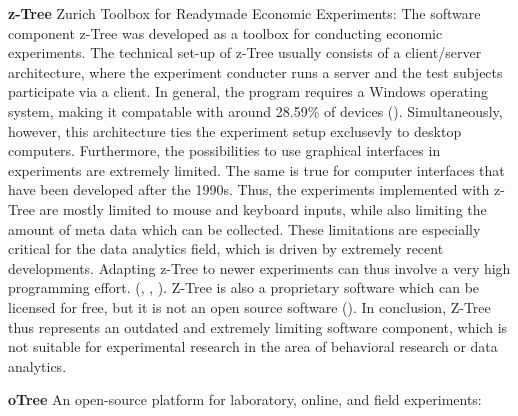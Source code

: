 \textbf{z-Tree} Zurich Toolbox for Readymade Economic Experiments:
The software component z-Tree was developed as a toolbox for conducting economic experiments. The technical set-up of z-Tree usually consists of a client/server architecture, where the experiment conducter runs a server and the test subjects participate via a client. In general, the program requires a Windows operating system, making it compatable with around 28.59\% of devices (\cite{statcounter.2023}). Simultaneously, however, this architecture ties the experiment setup exclusevly to desktop computers. %
Furthermore, the possibilities to use graphical interfaces in experiments are extremely limited. The same is true for computer interfaces that have been developed after the 1990s. Thus, the experiments implemented with z-Tree are mostly limited to mouse and keyboard inputs, while also limiting the amount of meta data which can be collected. %
These limitations are especially critical for the data analytics field, which is driven by extremely recent developments. Adapting z-Tree to newer experiments can thus involve a very high programming effort. (\cite{Zurich.2023}, \cite{Fischbacher.2006}, \cite{Chen.2016}). Z-Tree is also a proprietary software which can be licensed for free, but it is not an open source software (\cite{Fischbacher.2006}). In conclusion, Z-Tree thus represents an outdated and extremely limiting software component, which is not suitable for experimental research in the area of behavioral research or data analytics.

\textbf{oTree} An open-source platform for laboratory, online, and field experiments:

